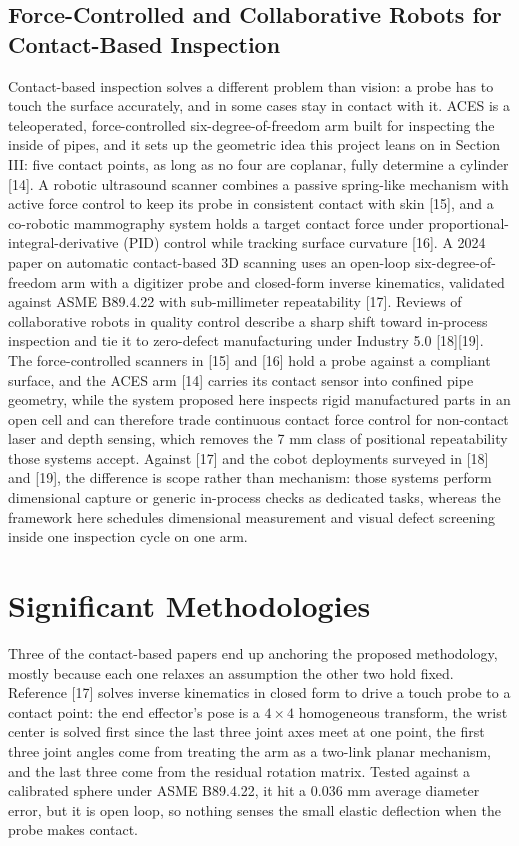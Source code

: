 \documentclass[conference]{IEEEtran}
\begin{document}
\subsection{Force-Controlled and Collaborative Robots for Contact-Based Inspection}
Contact-based inspection solves a different problem than vision: a probe has to touch the surface accurately, and in some cases stay in contact with it. ACES is a teleoperated, force-controlled six-degree-of-freedom arm built for inspecting the inside of pipes, and it sets up the geometric idea this project leans on in Section III: five contact points, as long as no four are coplanar, fully determine a cylinder {[}14{]}. A robotic ultrasound scanner combines a passive spring-like mechanism with active force control to keep its probe in consistent contact with skin {[}15{]}, and a co-robotic mammography system holds a target contact force under proportional-integral-derivative (PID) control while tracking surface curvature {[}16{]}. A 2024 paper on automatic contact-based 3D scanning uses an open-loop six-degree-of-freedom arm with a digitizer probe and closed-form inverse kinematics, validated against ASME B89.4.22 with sub-millimeter repeatability {[}17{]}. Reviews of collaborative robots in quality control describe a sharp shift toward in-process inspection and tie it to zero-defect manufacturing under Industry 5.0 {[}18{]}{[}19{]}. The force-controlled scanners in {[}15{]} and {[}16{]} hold a probe against a compliant surface, and the ACES arm {[}14{]} carries its contact sensor into confined pipe geometry, while the system proposed here inspects rigid manufactured parts in an open cell and can therefore trade continuous contact force control for non-contact laser and depth sensing, which removes the 7 mm class of positional repeatability those systems accept. Against {[}17{]} and the cobot deployments surveyed in {[}18{]} and {[}19{]}, the difference is scope rather than mechanism: those systems perform dimensional capture or generic in-process checks as dedicated tasks, whereas the framework here schedules dimensional measurement and visual defect screening inside one inspection cycle on one arm.

\section{Significant Methodologies}
\label{sec:methodologies}
Three of the contact-based papers end up anchoring the proposed methodology, mostly because each one relaxes an assumption the other two hold fixed. Reference {[}17{]} solves inverse kinematics in closed form to drive a touch probe to a contact point: the end effector's pose is a $4\times4$ homogeneous transform, the wrist center is solved first since the last three joint axes meet at one point, the first three joint angles come from treating the arm as a two-link planar mechanism, and the last three come from the residual rotation matrix. Tested against a calibrated sphere under ASME B89.4.22, it hit a 0.036 mm average diameter error, but it is open loop, so nothing senses the small elastic deflection when the probe makes contact.
\end{document}
